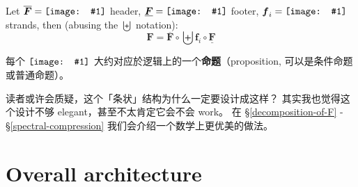 \documentclass[orivec]{llncs}
\newcommand{\cc}[2]{#1}
\newcommand{\cc}[2]{#2}
\newcommand{\vect}[1]{\boldsymbol{#1}}
\newcommand*\Graph{\vcenter{\hbox{\texttt{[image: ../graph-symbol.png]}}}}
\newcommand*\Hypergraph{\vcenter{\hbox{\texttt{[image: ../hypergraph-symbol.png]}}}}
\newcommand*\Tree{\vcenter{\hbox{\texttt{[image: ../tree-symbol.png]}}}}
\newcommand*\NewSym[1]{\vcenter{\hbox{\texttt{[image: \#1]}}}}
\begin{document}
Let $\overline{\vect{F}} = \NewSym{header.png} $ header, $\underline{\vect{F}} = \NewSym{footer.png} $ footer, $\vect{f}_i = \NewSym{strand.png}$ strands, then (abusing the $\biguplus$ notation):
\begin{equation}
\vect{F} = \overline{\vect{F}} \circ \biguplus \vect{f}_i \circ \underline{\vect{F}}
\end{equation}
\cc{
每个 $\NewSym{strand.png}$ 大约对应於逻辑上的一个\textbf{命题}（proposition, 可以是条件命题或普通命题）。
}{
Each $\NewSym{strand.png}$ roughly corresponds to a single \textbf{proposition} in logic-based AI. Such propositions may be conditional or plain statements.
}

读者或许会质疑，这个「条状」结构为什么一定要设计成这样？  其实我也觉得这个设计不够 elegant，甚至不太肯定它会不会 work。  在 \S\ref{decomposition-of-F} - \S\ref{spectral-compression} 我们会介绍一个数学上更优美的做法。 

%
%
%
%
%

\section{Overall architecture}
\end{document}
